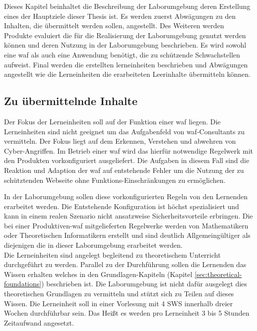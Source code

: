 Dieses Kapitel beinhaltet die Beschreibung der Laborumgebung deren Erstellung eines der Hauptziele dieser Thesis ist.
Es werden zuerst Abwägungen zu den Inhalten, die übermittelt werden sollen, angestellt.
Des Weiteren werden Produkte evaluiert die für die Realisierung der Laborumgebung genutzt werden können und deren Nutzung in der Laborumgebung beschrieben.
Es wird sowohl eine \ac{waf} als auch eine Anwendung benötigt, die zu schützende Schwachstellen aufweist.
Final werden die erstellten lerneinheiten beschrieben und Abwägungen angestellt wie die Lerneinheiten die erarbeiteten Leerinhalte übermitteln können.

\subsection{Zu übermittelnde Inhalte}
\label{sec:learnings-metha}

Der Fokus der Lerneinheiten soll auf der Funktion einer \ac{waf} liegen.
Die Lerneinheiten sind nicht geeignet um das Aufgabenfeld von \ac{waf}-Consultants zu vermitteln.
Der Fokus liegt auf dem Erkennen, Verstehen und abwehren von Cyber-Angriffen.
Im Betrieb einer \ac{waf} wird das hierfür notwendige Regelwerk mit den Produkten vorkonfiguriert ausgeliefert.
Die Aufgaben in diesem Fall sind die Reaktion und Adaption der \ac{waf} auf entstehende Fehler um die Nutzung der zu schütztenden Webseite ohne Funktions-Einschränkungen zu ermöglichen.

In der Laborumgebung sollen diese vorkonfigurierten Regeln von den Lernenden erarbeitet werden.
Die Entstehende Konfiguration ist höchst spezialisiert und kann in einem realen Szenario nicht ansatzweise Sicherheitsvorteile erbringen.
Die bei einer Produktiven-\ac{waf} mitgelieferten Regelwerke werden von Mathematikern oder Theoretischen Informatikern erstellt und sind deutlich Allgemeingültiger als diejenigen die in dieser Laborumgebung erarbeitet werden.\\

Die Lerneinheiten sind angelegt begleitend zu theoretischem Unterricht durchgeführt zu werden.
Parallel zu der Durchführung sollen die Lernenden das Wissen erhalten welches in den Grundlagen-Kapiteln (Kapitel \ref{sec:theoretical-foundations}) beschrieben ist.
Die Laborumgebung ist nicht dafür ausgelegt dies theoretischen Grundlagen zu vermitteln und stützt sich zu Teilen auf dieses Wissen.
Die Lerneinheit soll in einer Vorlesung mit 4 SWS innerhalb dreier Wochen durchführbar sein.
Das Heißt es werden pro Lerneinheit 3 bis 5 Stunden Zeitaufwand angesetzt.

